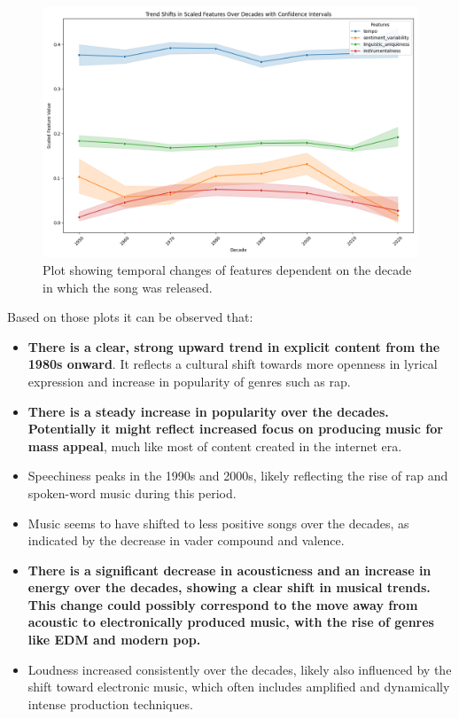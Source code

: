 \begin{center}
\begin{figure}[H]
  \centering
  \includegraphics[width=5in]{img/temporal_trends_3.png}
  \caption{Plot showing temporal changes of features dependent on the decade in
  which the song was released.}
  \label{Figure:fig_eh}
\end{figure}
\end{center}

Based on those plots it can be observed that:
\begin{itemize}
  \item \textbf{There is a clear, strong upward trend in explicit content from
    the 1980s onward}. It reflects a cultural shift  towards more openness in
    lyrical expression and increase in popularity of genres such as rap.
  \item \textbf{ There is a steady increase in popularity over the decades.
    Potentially it might reflect increased focus on  producing music for mass
  appeal}, much like most of content created in the internet era.
  \item Speechiness peaks in the 1990s and 2000s, likely reflecting the rise of
    rap and spoken-word music during this period.
  \item Music seems to have shifted to less  positive songs over the decades, as
    indicated by the decrease in vader compound and valence. 
  \item \textbf{There is a significant decrease in acousticness and
      an increase in energy over the decades, showing a clear
      shift in musical trends. This change could possibly correspond to
      the move away from acoustic to electronically produced music, with the
      rise of genres like EDM and modern pop.}
  \item Loudness increased consistently over the decades, likely also
    influenced by the shift toward electronic music, which often includes
    amplified and dynamically intense production techniques.
\end{itemize}
